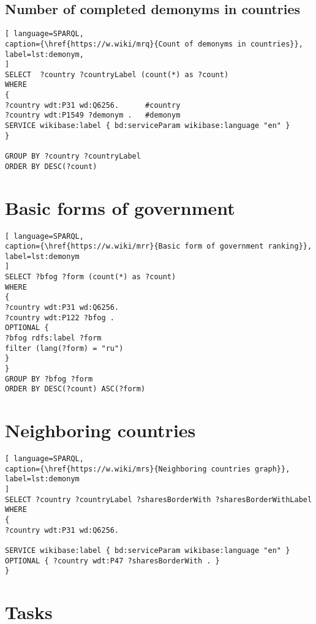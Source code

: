 \subsection{Number of completed demonyms in countries}

\begin{lstlisting}[ language=SPARQL, 
caption={\href{https://w.wiki/mrq}{Count of demonyms in countries}},
label=lst:demonym, 
]
SELECT  ?country ?countryLabel (count(*) as ?count)
WHERE
{
?country wdt:P31 wd:Q6256.      #country
?country wdt:P1549 ?demonym .   #demonym
SERVICE wikibase:label { bd:serviceParam wikibase:language "en" }
}

GROUP BY ?country ?countryLabel 
ORDER BY DESC(?count)
\end{lstlisting}

\section{Basic forms of government}

\begin{lstlisting}[ language=SPARQL, 
caption={\href{https://w.wiki/mrr}{Basic form of government ranking}},
label=lst:demonym
]
SELECT ?bfog ?form (count(*) as ?count)
WHERE 
{
?country wdt:P31 wd:Q6256.
?country wdt:P122 ?bfog .
OPTIONAL {
?bfog rdfs:label ?form
filter (lang(?form) = "ru")
}
}
GROUP BY ?bfog ?form
ORDER BY DESC(?count) ASC(?form)
\end{lstlisting}

\section{Neighboring countries}

\begin{lstlisting}[ language=SPARQL, 
caption={\href{https://w.wiki/mrs}{Neighboring countries graph}},
label=lst:demonym
]
SELECT ?country ?countryLabel ?sharesBorderWith ?sharesBorderWithLabel
WHERE
{
?country wdt:P31 wd:Q6256.

SERVICE wikibase:label { bd:serviceParam wikibase:language "en" }
OPTIONAL { ?country wdt:P47 ?sharesBorderWith . }
}
\end{lstlisting}

\section{Tasks}